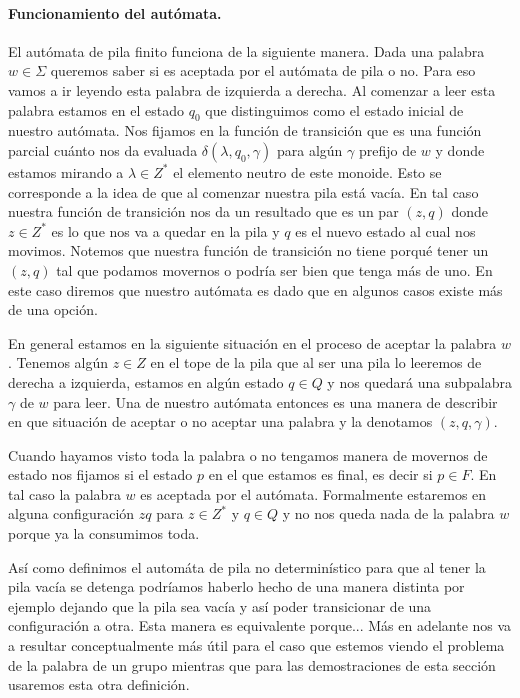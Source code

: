 \documentclass[tesis.tex]{subfiles}
\newcommand{\APND}{automáta de pila no determinístico }
\begin{document}
\paragraph{Funcionamiento del autómata.}

El autómata de pila finito funciona de la siguiente manera. 
Dada una palabra $w \in \Sigma$ queremos saber si es aceptada por el autómata de pila o no. Para eso vamos a ir leyendo esta palabra de izquierda a derecha. 
Al comenzar a leer esta palabra estamos en el estado $q_0$ que distinguimos como el estado inicial de nuestro autómata. 
Nos fijamos en la función de transición que es una función parcial cuánto nos da evaluada  $\delta(\lambda,q_0,\gamma)$ para algún $\gamma$ prefijo de $w$ y donde estamos mirando a $\lambda \in Z^*$ el elemento neutro de este monoide. 
Esto se corresponde a la idea de que al comenzar nuestra pila está vacía. 
En tal caso nuestra función de transición nos da un resultado que es un par $(z,q)$ donde $z \in Z^{*}$ es lo que nos va a quedar en la pila y $q$ es el nuevo estado al cual nos movimos. 
Notemos que nuestra función de transición no tiene porqué tener un $(z,q)$ tal que podamos movernos o podría ser bien que tenga más de uno. 
En este caso diremos que nuestro autómata es  dado que en algunos casos existe más de una opción.

En general estamos en la siguiente situación en el proceso de aceptar la palabra $w$. 
Tenemos algún $z \in Z$ en el tope de la pila que al ser una pila lo leeremos de derecha a izquierda, estamos en algún estado $q \in Q$ y nos quedará una subpalabra $\gamma$ de $w$ para leer. Una  de nuestro autómata entonces es una manera de describir en que situación de aceptar o no aceptar una palabra y la denotamos $(z,q,\gamma)$. 

Cuando hayamos visto toda la palabra o no tengamos manera de movernos de estado nos fijamos si el estado $p$ en el que estamos es final, es decir si $p \in F$. 
En tal caso la palabra $w$ es aceptada por el autómata. Formalmente estaremos en alguna configuración $zq$ para $z \in Z^*$ y $q \in Q$ y no nos queda nada de la palabra $w$ porque ya la consumimos toda.
\medskip
\begin{obs}
	Así como definimos el \APND para que al tener la pila vacía se detenga podríamos haberlo hecho de una manera distinta por ejemplo dejando que la pila sea vacía y así poder transicionar de una configuración a otra.	
	Esta manera es equivalente porque...
	Más en adelante nos va a resultar conceptualmente más útil para el caso que estemos viendo el problema de la palabra de un grupo mientras que para las demostraciones de esta sección usaremos esta otra definición.
\end{obs}
\end{document}
